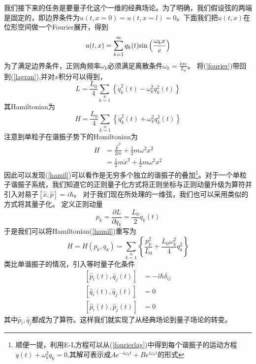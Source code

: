我们接下来的任务是要量子化这个一维的经典场论。为了明确，我们假设弦的两端是固定的，即边界条件为$u(t,x=0)=u(t,x=l)=0$。下面我们把$u(t,x)$在位形空间做一个Fourier展开，得到
\begin{equation}
\label{fourier}
    u(t,x)=\sum\limits_{k=1}\limits^{\infty} q_{k}(t){\rm{sin}}\left( \frac{ \omega _{k} x}{c} \right)
\end{equation}
为了满足边界条件，正则角频率$\omega_{k}$必须满足离散条件$\omega_{k}=\frac{k\pi c}{L_{0}}$。
将(\ref{fourier})带回到(\ref{lagran}),并对$x$积分可以得到，
\begin{equation}
\label{fourierlag}
    L=\frac{L_{0}}{4}\sum\limits_{k=1}\limits^{\infty}\left\{\dot{q}_{k}^{2}(t)-\omega_{k}^{2}q_{k}^{2}(t)\right\}
\end{equation}
其Hamiltonian为
\begin{equation}
\label{hamil}
    H=\frac{L_{0}}{4}\sum\limits_{k=1}\limits^{\infty}\left\{\dot{q}_{k}^{2}(t)+\omega_{k}^{2}q_{k}^{2}(t)\right\}
\end{equation}
注意到单粒子在谐振子势下的Hamiltonian为
\begin{equation}
\begin{aligned}
    H&=\frac{\vec{p}^{2}}{2m}+\frac{1}{2}m\omega^{2}x^{2}\\
    &=\frac{1}{2}m\dot{x}^{2}+\frac{1}{2}m\omega^{2}x^{2}
    \end{aligned}
\end{equation}
因此可以发现(\ref{hamil})可以看作是无穷多个独立的谐振子的叠加\footnote{顺便一提，利用E-L方程可以从(\ref{fourierlag})中得到每个谐振子的运动方程$\ddot{q}(t)+\omega_{k}^{2}q_{k}=0$,其解可表示成$Ae^{-i\omega_{k}t}+Be^{i\omega_{k}t}$的形式}。对于一个单粒子谐振子系统，我们知道它的正则量子化方式将正则坐标与正则动量升级为算符并引入对易子$[\hat{x},\hat{p}]=i\hbar$。
对于我们现在所处理的一维弦，我们也可以采用类似的方式将其量子化。
定义正则动量
\begin{equation}
\label{canmomentum}
    p_{k}=\frac{\partial L}{\partial \dot{q}_{k}}=\frac{L_{0}}{2}\dot{q}_{k}(t)
\end{equation}
于是我们可以将Hamiltonian(\ref{hamil})重写为
\begin{equation}
\label{hamilnormal}
     H=H(p_{k},q_{k})=\sum\limits_{k=1}\limits^{\infty}\left\{\frac{p_{k}^{2}}{L_{0}}+\frac{L_{0}\omega_{k}^{2}}{4}q_{k}^{2}\right\}
\end{equation}
类比单谐振子的情况，引入等时量子化条件
\begin{equation}
\label{eqtime}
\begin{aligned}
    \left[\hat{p}_{i}(t),\hat{q}_{j}(t)\right]&=-i\hbar\delta_{ij}\\
    \left[\hat{q}_{i}(t),\hat{q}_{j}(t)\right]&=0\\
    \left[\hat{p}_{i}(t),\hat{p}_{j}(t)\right]&=0
    \end{aligned}
\end{equation}
其中$\hat{p}_{i},\hat{q}_{j}$都成为了算符。这样我们就实现了从经典场论到量子场论的转变。

